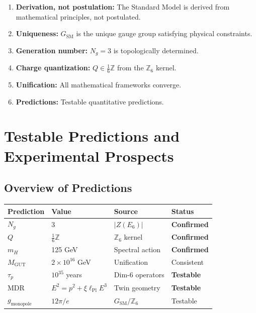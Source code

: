 \documentclass[11pt,a4paper,openright]{book}
\theoremstyle{plain}
\theoremstyle{definition}
\newcommand{\SM}{\mathrm{SM}}
\newcommand{\Z}{\mathbb{Z}}
\newcommand{\ellPl}{\ell_{\mathrm{Pl}}}
\newcommand{\MGUT}{M_{\mathrm{GUT}}}
\begin{document}
\begin{enumerate}
    \item \textbf{Derivation, not postulation:} The Standard Model is derived from mathematical principles, not postulated.
    
    \item \textbf{Uniqueness:} $G_{\SM}$ is the unique gauge group satisfying physical constraints.
    
    \item \textbf{Generation number:} $N_g = 3$ is topologically determined.
    
    \item \textbf{Charge quantization:} $Q \in \frac{1}{6}\Z$ from the $\Z_6$ kernel.
    
    \item \textbf{Unification:} All mathematical frameworks converge.
    
    \item \textbf{Predictions:} Testable quantitative predictions.
\end{enumerate}

\chapter{Testable Predictions and Experimental Prospects}
\label{ch:predictions}

\section{Overview of Predictions}

\begin{center}
\begin{tabular}{llll}
\toprule
\textbf{Prediction} & \textbf{Value} & \textbf{Source} & \textbf{Status} \\
\midrule
$N_g$ & 3 & $|Z(E_6)|$ & \textbf{Confirmed} \\
$Q$ & $\frac{1}{6}\Z$ & $\Z_6$ kernel & \textbf{Confirmed} \\
$m_H$ & 125 GeV & Spectral action & \textbf{Confirmed} \\
$\MGUT$ & $2 \times 10^{16}$ GeV & Unification & Consistent \\
$\tau_p$ & $10^{35}$ years & Dim-6 operators & \textbf{Testable} \\
MDR & $E^2 = p^2 + \xi\ellPl E^3$ & Twin geometry & \textbf{Testable} \\
$g_{\mathrm{monopole}}$ & $12\pi/e$ & $G_{\SM}/\Z_6$ & Testable \\
\bottomrule
\end{tabular}
\end{center}
\end{document}
